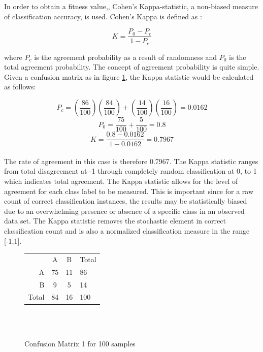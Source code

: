 \documentclass[journal,comsoc]{IEEEtran}
\begin{document}
In order to obtain a fitness value,, Cohen's Kappa-statistic, a non-biased measure of classification accuracy, is used. Cohen's Kappa is defined as \cite{ben2008comparison}:

\begin{equation}
	K = \frac{P_0 - P_c}{1 - P_c}
\end{equation}

where $P_c$ is the agreement probability as a result of randomness and $P_0$ is the total agreement probability. The concept of agreement probability is quite simple. Given a confusion matrix as in figure \ref{fig:confuse}, the Kappa statistic would be calculated as follows:

$$
P_c = (\frac{86}{100})(\frac{84}{100}) + (\frac{14}{100})(\frac{16}{100}) = 0.0162
$$
$$
P_0 = \frac{75}{100} + \frac{5}{100} = 0.8
$$
\begin{equation}
K = \frac{0.8 - 0.0162}{1 - 0.0162} = 0.7967
\end{equation}
\hfill\\

The rate of agreement in this case is therefore 0.7967. The Kappa statistic ranges from total disagreement at -1 through completely random classification at 0, to 1 which indicates total agreement. The Kappa statistic allows for the level of agreement for each class label to be measured. This is important since for a raw count of correct classification instances, the results may be statistically biased due to an overwhelming presence or absence of a specific class in an observed data set. The Kappa statistic removes the stochastic element in correct classification count \cite{ben2008comparison} and is also a normalized classification measure in the range [-1,1]. 

\begin{figure}[t!]
\centering
\begin{tabular}{ r|c|c|l }
\multicolumn{1}{r}{}
 &  \multicolumn{1}{c}{A}
 & \multicolumn{1}{c}{B}
& \multicolumn{1}{l}{Total} \\
\cline{2-3}
A & 75 & 11 & 86 \\
\cline{2-3}
B & 9 & 5 & 14 \\
\cline{2-3}
\multicolumn{1}{r}{Total}
 &  \multicolumn{1}{c}{84}
 & \multicolumn{1}{c}{16}
& \multicolumn{1}{l}{100}

\end{tabular}
\hfill\\\hfill\\
\caption{Confusion Matrix 1 for 100 samples}
\label{fig:confuse}
\end{figure}
\end{document}
